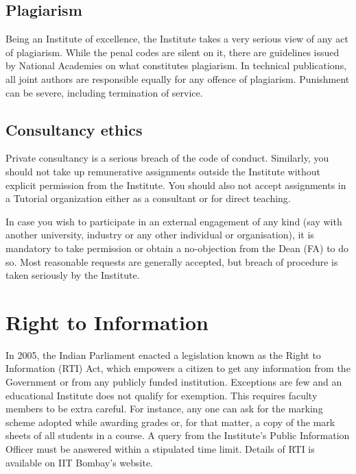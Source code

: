 \documentclass[
  10pt,
  a5paper,
  10pt,
  openany]{amsbook}
\begin{document}
\section{Plagiarism}\label{plagiarism}

Being an Institute of excellence, the Institute takes a very serious
view of any act of plagiarism. While the penal codes are silent on it,
there are guidelines issued by National Academies on what constitutes
plagiarism. In technical publications, all joint authors are responsible
equally for any offence of plagiarism. Punishment can be severe,
including termination of service.

\section{Consultancy ethics}\label{consultancy-ethics}

Private consultancy is a serious breach of the code of conduct.
Similarly, you should not take up remunerative assignments outside the
Institute without explicit permission from the Institute. You should
also not accept assignments in a Tutorial organization either as a
consultant or for direct teaching.

In case you wish to participate in an external engagement of any kind
(say with another university, industry or any other individual or
organisation), it is mandatory to take permission or obtain a
no-objection from the Dean (FA) to do so. Most reasonable requests are
generally accepted, but breach of procedure is taken seriously by the
Institute.

\chapter{Right to Information}\label{right-to-information}

In 2005, the Indian Parliament enacted a legislation known as the Right
to Information (RTI) Act, which empowers a citizen to get any
information from the Government or from any publicly funded institution.
Exceptions are few and an educational Institute does not qualify for
exemption. This requires faculty members to be extra careful. For
instance, any one can ask for the marking scheme adopted while awarding
grades or, for that matter, a copy of the mark sheets of all students in
a course. A query from the Institute's Public Information Officer must
be answered within a stipulated time limit. Details of RTI is available
on IIT Bombay's website.
\end{document}
